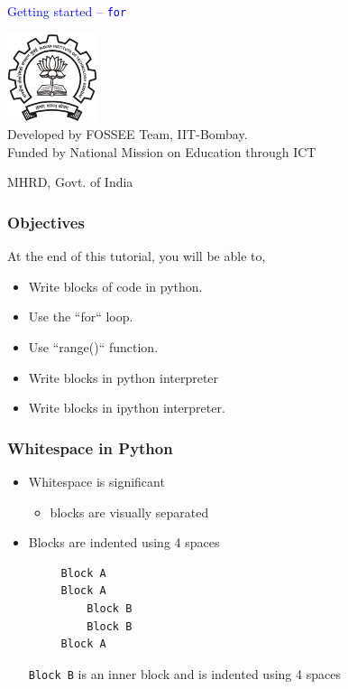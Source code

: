 \documentclass[presentation]{beamer}
\title{}
\author{FOSSEE}
\date{}
\begin{document}
\begin{frame}

\begin{center}
\textcolor{blue}{Getting started -- \texttt{for}}
\end{center}
\begin{center}
\includegraphics[scale=0.25]{../images/iitb-logo.png}\\
Developed by FOSSEE Team, IIT-Bombay. \\ 
Funded by National Mission on Education through ICT

MHRD, Govt. of India
\end{center}
\end{frame}
\begin{frame}
\frametitle{Objectives}
\label{sec-2}

  At the end of this tutorial, you will be able to, 

\begin{itemize}
\item Write blocks of code in python.
\item Use the ``for`` loop.
\item Use ``range()`` function.
\item Write blocks in python interpreter
\item Write blocks in ipython interpreter.
\end{itemize}
\end{frame}
\begin{frame}[fragile]
\frametitle{Whitespace in Python}
\label{sec-3}


\begin{itemize}
\item Whitespace is significant
\begin{itemize}
\item blocks are visually separated
\end{itemize}
\item Blocks are indented using 4 spaces
\begin{verbatim}
     Block A
     Block A
         Block B
         Block B
     Block A
\end{verbatim}

    \verb~Block B~ is an inner block and is indented using 4 spaces
\end{itemize}
\end{frame}
\end{document}
